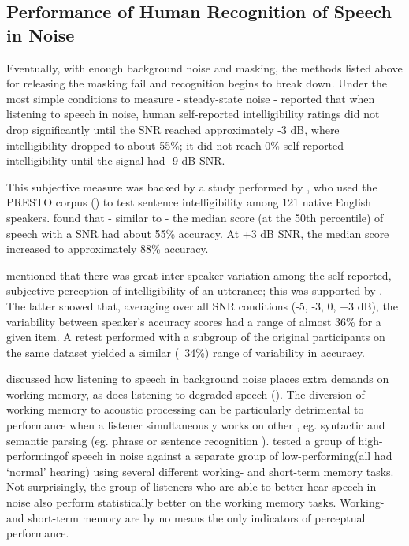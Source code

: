 \subsection{Performance of Human Recognition of Speech in Noise}

Eventually, with enough background noise and masking, the methods listed above for releasing the masking fail and recognition begins to break down.  Under the most simple conditions to measure - steady-state noise - \cite{ding:13} reported that when listening to speech in noise, human self-reported intelligibility ratings did not drop significantly until the SNR reached approximately -3 dB, where intelligibility dropped to about 55\%;  it did not reach 0\% self-reported intelligibility until the signal had -9 dB SNR.

This subjective measure was backed by a study performed by \cite{gilbert:13}, who used the PRESTO corpus (\cite{garofolo:93}) to test sentence intelligibility among 121 native English speakers.  \cite{gilbert:13} found that - similar to \cite{ding:13} - the median score (at the 50th percentile) of speech with a \DIFdelbegin {}\DIFdelend \DIFaddbegin {}\DIFaddend SNR had about 55\% accuracy.  At +3 dB SNR, the median score increased to approximately 88\% accuracy.

\cite{ding:13} mentioned that there was great inter-speaker variation among the self-reported, subjective perception of intelligibility of an utterance; this was \DIFdelbegin {}\DIFdelend \DIFaddbegin {}\DIFaddend supported by \cite{gilbert:13}\DIFdelbegin {}\DIFdelend . The latter showed that, averaging over all SNR conditions (-5, -3, 0, +3 dB), the variability between speaker's accuracy scores had a range of almost 36\% for a given item.  A retest performed with a subgroup of the original participants on the same dataset yielded a similar (~34\%) range of variability in accuracy.  

\cite{francis:10} discussed how listening to speech in background noise places extra demands on working memory, as does listening to degraded speech (\cite{francis:09}).  The diversion of working memory to acoustic processing can be particularly detrimental to performance when a listener simultaneously works on other \DIFdelbegin {}\DIFdelend \DIFaddbegin {}\DIFaddend , eg. syntactic and semantic parsing (eg. phrase or sentence recognition \cite{caplan:99}). \cite{tamati:13} tested a group of \DIFaddbegin {}\DIFaddend high-performing\DIFdelbegin {}\DIFdelend \DIFaddbegin {}\DIFaddend of speech in noise against a separate group of \DIFaddbegin {}\DIFaddend low-performing\DIFdelbegin {}\DIFdelend \DIFaddbegin {}\DIFaddend (all had `normal' hearing) using several different working- and short-term memory tasks.  Not surprisingly, the group of listeners who are able to better hear speech in noise also perform statistically better on the working memory tasks.  Working- and short-term memory are by no means the only indicators of perceptual performance.


